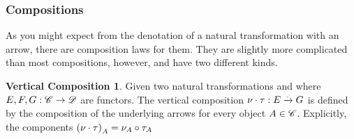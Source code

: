 \subsubsection{Compositions}
As you might expect from the denotation of a natural transformation with an
arrow, there are composition laws for them. They are slightly more complicated
than most compositions, however, and have two different kinds.
\theoremstyle{definition}\newtheorem*{verticalcompositiondef}{Vertical Composition}
\theoremstyle{definition}\newtheorem*{horizontalcompositiondef}{Horizontal Composition}

\cite{RelationalAlgebraByWayOfAdjunctions}
\begin{verticalcompositiondef}
    Given two natural transformations
     and
     where $\mathnormal{E, F, G}: \mathscr{C} \to
    \mathscr{D}$ are functors. The vertical composition
    $\nu \cdot \tau: \mathnormal{E} \xrightarrow{.} \mathnormal{G}$
    is defined by the composition of the underlying arrows for every
    object $\mathnormal{A} \in \mathscr{C}$. Explicitly, the components
    $\left(\nu \cdot \tau\right)_{A} =
    \mathnormal{\nu_{A}} \circ \mathnormal{\tau_{A}}$
\label{sec:verticalcomposition}
\end{verticalcompositiondef}



